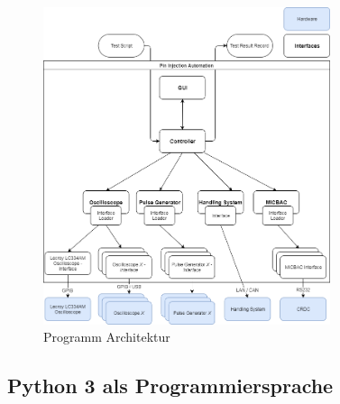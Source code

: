 \begin{figure}[H]
	\centering
	\includegraphics[width=0.75\textwidth, height=0.75\textwidth]{graphics/program_architecture.png}
	\caption{Programm Architektur}
	\label{fig:prg_architecture}
\end{figure}
	
\subsection{Python 3 als Programmiersprache}
\label{subsec:py3_as_lang}


